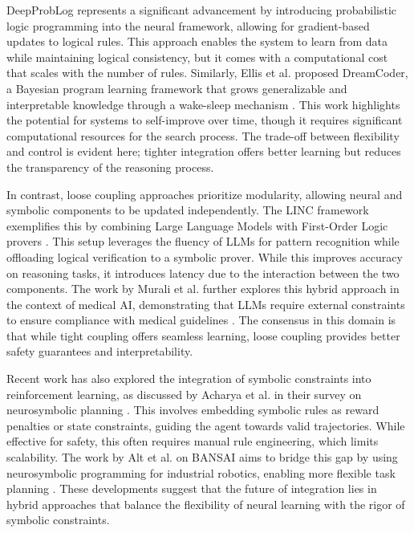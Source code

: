 \documentclass{article}
\begin{document}
DeepProbLog represents a significant advancement by introducing probabilistic logic programming into the neural framework, allowing for gradient-based updates to logical rules. This approach enables the system to learn from data while maintaining logical consistency, but it comes with a computational cost that scales with the number of rules. Similarly, Ellis et al. proposed DreamCoder, a Bayesian program learning framework that grows generalizable and interpretable knowledge through a wake-sleep mechanism \cite{ellis2023dreamcoder}. This work highlights the potential for systems to self-improve over time, though it requires significant computational resources for the search process. The trade-off between flexibility and control is evident here; tighter integration offers better learning but reduces the transparency of the reasoning process.

In contrast, loose coupling approaches prioritize modularity, allowing neural and symbolic components to be updated independently. The LINC framework exemplifies this by combining Large Language Models with First-Order Logic provers \cite{olausson2023linc}. This setup leverages the fluency of LLMs for pattern recognition while offloading logical verification to a symbolic prover. While this improves accuracy on reasoning tasks, it introduces latency due to the interaction between the two components. The work by Murali et al. further explores this hybrid approach in the context of medical AI, demonstrating that LLMs require external constraints to ensure compliance with medical guidelines \cite{murali2025integrating}. The consensus in this domain is that while tight coupling offers seamless learning, loose coupling provides better safety guarantees and interpretability.

Recent work has also explored the integration of symbolic constraints into reinforcement learning, as discussed by Acharya et al. in their survey on neurosymbolic planning \cite{acharya2023neurosymbolic}. This involves embedding symbolic rules as reward penalties or state constraints, guiding the agent towards valid trajectories. While effective for safety, this often requires manual rule engineering, which limits scalability. The work by Alt et al. on BANSAI aims to bridge this gap by using neurosymbolic programming for industrial robotics, enabling more flexible task planning \cite{alt2024bansai}. These developments suggest that the future of integration lies in hybrid approaches that balance the flexibility of neural learning with the rigor of symbolic constraints.
\end{document}
